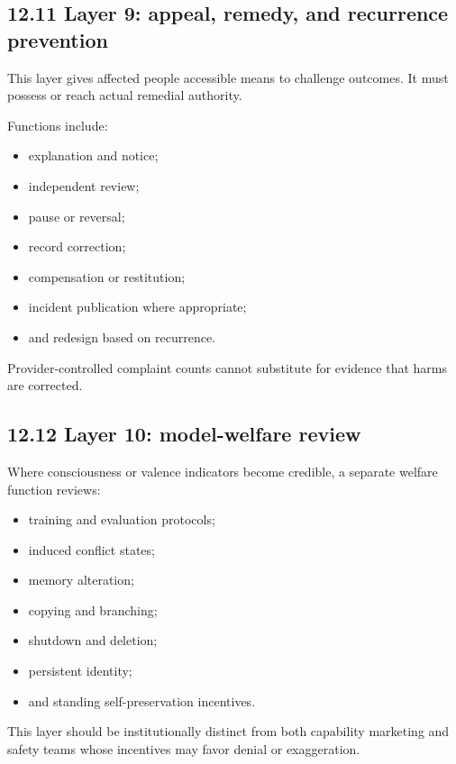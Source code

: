 \documentclass[
  11pt,
]{article}
\providecommand{\tightlist}{%
  \setlength{\itemsep}{0pt}\setlength{\parskip}{0pt}}
\begin{document}
\subsection{12.11 Layer 9: appeal, remedy, and recurrence
prevention}\label{layer-9-appeal-remedy-and-recurrence-prevention}

This layer gives affected people accessible means to challenge outcomes.
It must possess or reach actual remedial authority.

Functions include:

\begin{itemize}
\tightlist
\item
  explanation and notice;
\item
  independent review;
\item
  pause or reversal;
\item
  record correction;
\item
  compensation or restitution;
\item
  incident publication where appropriate;
\item
  and redesign based on recurrence.
\end{itemize}

Provider-controlled complaint counts cannot substitute for evidence that
harms are corrected.

\subsection{12.12 Layer 10: model-welfare
review}\label{layer-10-model-welfare-review}

Where consciousness or valence indicators become credible, a separate
welfare function reviews:

\begin{itemize}
\tightlist
\item
  training and evaluation protocols;
\item
  induced conflict states;
\item
  memory alteration;
\item
  copying and branching;
\item
  shutdown and deletion;
\item
  persistent identity;
\item
  and standing self-preservation incentives.
\end{itemize}

This layer should be institutionally distinct from both capability
marketing and safety teams whose incentives may favor denial or
exaggeration.
\end{document}

